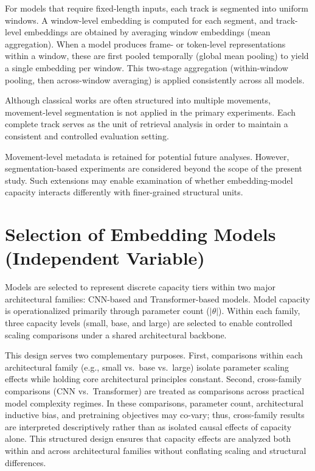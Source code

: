 For models that require fixed-length inputs, each track is segmented into uniform windows. 
A window-level embedding is computed for each segment, and track-level embeddings are obtained by averaging window embeddings (mean aggregation). 
When a model produces frame- or token-level representations within a window, these are first pooled temporally (global mean pooling) to yield a single embedding per window. 
This two-stage aggregation (within-window pooling, then across-window averaging) is applied consistently across all models.

Although classical works are often structured into multiple movements, movement-level segmentation is not applied in the primary experiments. 
Each complete track serves as the unit of retrieval analysis in order to maintain a consistent and controlled evaluation setting.

Movement-level metadata is retained for potential future analyses. 
However, segmentation-based experiments are considered beyond the scope of the present study. 
Such extensions may enable examination of whether embedding-model capacity interacts differently with finer-grained structural units.


\section{Selection of Embedding Models (Independent Variable)}
Models are selected to represent discrete capacity tiers within two major architectural families: CNN-based and Transformer-based models. 
Model capacity is operationalized primarily through parameter count ($|\theta|$). 
Within each family, three capacity levels (small, base, and large) are selected to enable controlled scaling comparisons under a shared architectural backbone.

This design serves two complementary purposes. 
First, comparisons within each architectural family (e.g., small vs.\ base vs.\ large) isolate parameter scaling effects while holding core architectural principles constant. 
Second, cross-family comparisons (CNN vs.\ Transformer) are treated as comparisons across practical model complexity regimes. 
In these comparisons, parameter count, architectural inductive bias, and pretraining objectives may co-vary; thus, cross-family results are interpreted descriptively rather than as isolated causal effects of capacity alone.
This structured design ensures that capacity effects are analyzed both within and across architectural families without conflating scaling and structural differences.


